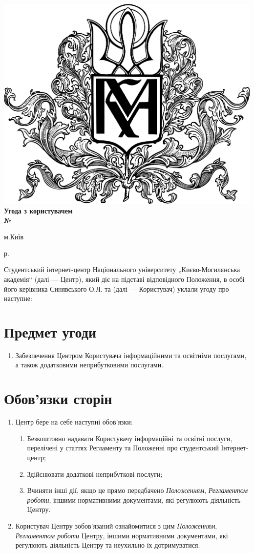 \large
    \setcounter{section}{0}
    \begin{center}
	\includegraphics[width=3 cm]{gerb} \\
        \huge \bf
        Угода з користувачем  \\
        № 
    \end{center}
    \small
    \parbox{0.45\textwidth}{м.Київ}
    \parbox{0.45\textwidth}{\begin{flushright}    р.  \\ \end{flushright}}

    \noindent Студентський інтернет-центр Національного університету „Києво-Могилянська академія“ (далі — Центр), який діє на підставі 
    відповідного Положення, в особі його керівника Синявського О.Л. та \textit{} (далі — Користувач) уклали   
    угоду про наступне:
%
    \section {Предмет угоди}
    \begin{enumerate}
        \item Забезпечення Центром Користувача інформаційними та освітніми послугами, а також додатковими неприбутковими послугами.
    \end{enumerate}
%
    \section {Обов’язки сторін}
    \begin{enumerate}
         cm
        \item Центр бере на себе наступні обов’язки: 
        \begin{enumerate}
             cm
            \item Безкоштовно надавати Користувачу інформаційні та освітні послуги, перелічені у статтях Регламенту та
            Положенні про студентський Інтернет-центр; 
            \item Здійснювати додаткові неприбуткові послуги; 
            \item Вчиняти інші дії, якщо це прямо передбачено \textit{Положенням}, \textit{Регламентом роботи}, іншими 
            нормативними документами, які регулюють діяльність Центру. 
        \end{enumerate}
        \item Користувач Центру зобов’язаний ознайомитися з цим \textit{Положенням}, \textit{Регламентом роботи} Центру, іншими нормативними документами, які регулюють діяльність Центру та неухильно їх дотримуватися. 
    \end{enumerate}
%
